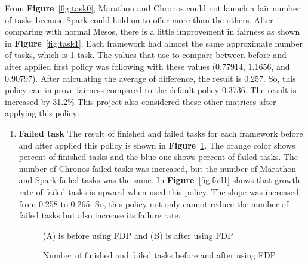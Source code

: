\documentclass[12pt,oneside,openright,a4paper]{cpe-english-project}
\begin{document}
\hspace{10mm}From \textbf{Figure}~\ref{fig:task0}, Marathon and Chronos could not launch a fair number of tasks because Spark could hold on to offer more than the others. After comparing with normal Mesos, there is a little improvement in fairness as shown in \textbf{Figure}~\ref{fig:task1}. Each framework had almost the same approximate number of tasks, which is 1 task. The values that use to compare between before and after applied first policy was following with these values (0.77914, 1.1656, and 0.90797). After calculating the average of difference, the result is 0.257. So, this policy can improve fairness compared to the default policy 0.3736. The result is increased by 31.2\%
\newline
This project also considered these other matrices after applying this policy: 
\begin{enumerate}
  \item \textbf{Failed task}
  \newline
The result of finished and failed tasks for each framework before and after applied this policy is shown in \textbf{Figure}~\ref{fig:finfail0-1}. The orange color shows percent of finished tasks and the blue one shows percent of failed tasks. The number of Chronos failed tasks was increased, but the number of Marathon and Spark failed tasks was the same. In \textbf{Figure}~\ref{fig:fail1} shows that growth rate of failed tasks is upward when used this policy. The slope was increased from 0.258 to 0.265. So, this policy not only cannot reduce the number of failed tasks but also increase its failure rate.
  \begin{figure}[!h]\centering
    \setlength{\fboxrule}{0mm} %
    \setlength{\fboxsep}{0cm}
    \caption{Number of finished and failed tasks before and after using FDP}\label{fig:finfail0-1}
    (A) is before using FDP and (B) is  after using FDP
\end{figure}
\begin{figure}[!h]\centering

\end{figure}
\end{enumerate}
\end{document}
